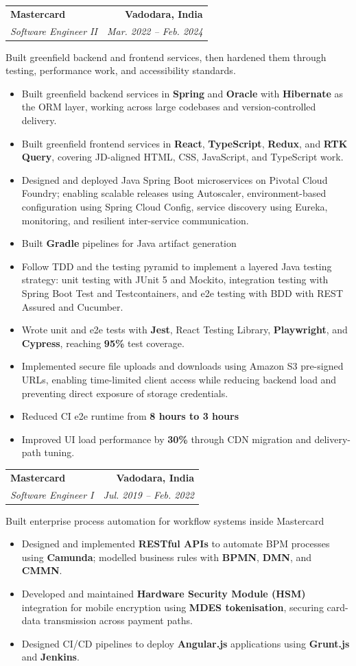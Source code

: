 \documentclass[a4paper,10pt]{article}
\makeatletter
\newcommand{\resumeItem}[1]{\item\small{#1}}
\newcommand{\resumeSubheading}[4]{%
  \vspace{1pt}
  \begin{tabular*}{\textwidth}[t]{l@{\extracolsep{\fill}}r}
    \textbf{#1} & \textbf{\small #2} \\
    \textit{\small #3} & \textit{\small #4} \\
  \end{tabular*}\vspace{-2pt}
}
\newcommand{\resumeRoleSummary}[1]{{\small #1\par}\vspace{-1pt}}
\newcommand{\resumeItemListStart}{\begin{itemize}}
\newcommand{\resumeItemListEnd}{\end{itemize}\vspace{-1pt}}
\makeatother
\begin{document}
\resumeSubheading
  {Mastercard}{Vadodara, India}
  {Software Engineer II}{Mar. 2022 -- Feb. 2024}
\resumeRoleSummary{Built greenfield backend and frontend services, then hardened them through testing, performance work, and accessibility standards.}
\resumeItemListStart
  \resumeItem{Built greenfield backend services in \textbf{Spring} and \textbf{Oracle} with \textbf{Hibernate} as the ORM layer, working across large codebases and version-controlled delivery.}
  \resumeItem{Built greenfield frontend services in \textbf{React}, \textbf{TypeScript}, \textbf{Redux}, and \textbf{RTK Query}, covering JD-aligned HTML, CSS, JavaScript, and TypeScript work.}
  \resumeItem{Designed and deployed Java Spring Boot microservices on Pivotal Cloud Foundry; enabling scalable releases using Autoscaler, environment-based configuration using Spring Cloud Config, service discovery using Eureka, monitoring, and resilient inter-service communication.}
  \resumeItem{Built \textbf{Gradle} pipelines for Java artifact generation}
    \resumeItem{Follow TDD and the testing pyramid to implement a layered Java testing strategy: unit testing with JUnit 5 and Mockito, integration testing with Spring Boot Test and Testcontainers, and e2e testing with BDD with REST Assured and Cucumber.}
  \resumeItem{Wrote unit and e2e tests with \textbf{Jest}, React Testing Library, \textbf{Playwright}, and \textbf{Cypress}, reaching \textbf{95\%} test coverage.}
   \resumeItem{Implemented secure file uploads and downloads using Amazon S3 pre-signed URLs, enabling time-limited client access while reducing backend load and preventing direct exposure of storage credentials.}

  \resumeItem{Reduced CI e2e runtime from \textbf{8 hours to 3 hours}}
  \resumeItem{Improved UI load performance by \textbf{30\%} through CDN migration and delivery-path tuning.}
\resumeItemListEnd

\resumeSubheading
  {Mastercard}{Vadodara, India}
  {Software Engineer I}{Jul. 2019 -- Feb. 2022}
\resumeRoleSummary{Built enterprise process automation for workflow systems inside Mastercard}
\resumeItemListStart
  \resumeItem{Designed and implemented \textbf{RESTful APIs} to automate BPM processes using \textbf{Camunda}; modelled business rules with \textbf{BPMN}, \textbf{DMN}, and \textbf{CMMN}.}
  \resumeItem{Developed and maintained \textbf{Hardware Security Module (HSM)} integration for mobile encryption using \textbf{MDES tokenisation}, securing card-data transmission across payment paths.}
  \resumeItem{Designed CI/CD pipelines to deploy \textbf{Angular.js} applications using \textbf{Grunt.js} and \textbf{Jenkins}.}
\resumeItemListEnd
\end{document}
